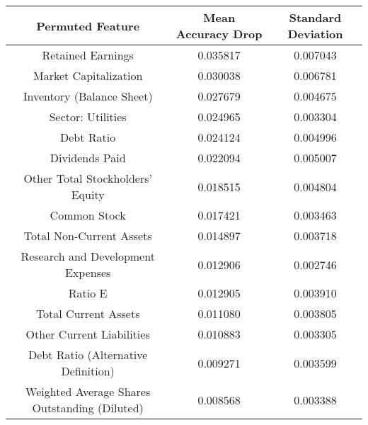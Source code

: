 \tiny
\begin{tabular}{ccc}
\toprule
Permuted Feature & Mean Accuracy Drop & Standard Deviation \\
\midrule
Retained Earnings & 0.035817 & 0.007043 \\
Market Capitalization & 0.030038 & 0.006781 \\
Inventory (Balance Sheet) & 0.027679 & 0.004675 \\
Sector: Utilities & 0.024965 & 0.003304 \\
Debt Ratio & 0.024124 & 0.004996 \\
Dividends Paid & 0.022094 & 0.005007 \\
Other Total Stockholders' Equity & 0.018515 & 0.004804 \\
Common Stock & 0.017421 & 0.003463 \\
Total Non-Current Assets & 0.014897 & 0.003718 \\
Research and Development Expenses & 0.012906 & 0.002746 \\
Ratio E & 0.012905 & 0.003910 \\
Total Current Assets & 0.011080 & 0.003805 \\
Other Current Liabilities & 0.010883 & 0.003305 \\
Debt Ratio (Alternative Definition) & 0.009271 & 0.003599 \\
Weighted Average Shares Outstanding (Diluted) & 0.008568 & 0.003388 \\
\bottomrule
\end{tabular}

\normalsize